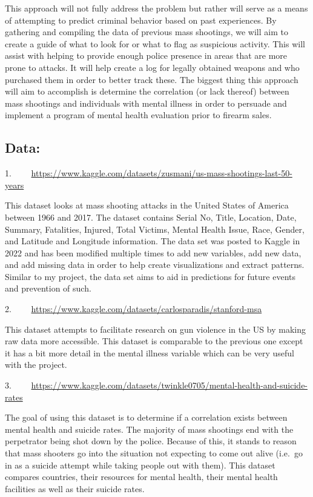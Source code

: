 \documentclass[
]{article}
\begin{document}
This approach will not fully address the problem but rather will serve
as a means of attempting to predict criminal behavior based on past
experiences. By gathering and compiling the data of previous mass
shootings, we will aim to create a guide of what to look for or what to
flag as suspicious activity. This will assist with helping to provide
enough police presence in areas that are more prone to attacks. It will
help create a log for legally obtained weapons and who purchased them in
order to better track these. The biggest thing this approach will aim to
accomplish is determine the correlation (or lack thereof) between mass
shootings and individuals with mental illness in order to persuade and
implement a program of mental health evaluation prior to firearm sales.

\subsection{Data:}\label{data}

1.~~~~
\url{https://www.kaggle.com/datasets/zusmani/us-mass-shootings-last-50-years}

This dataset looks at mass shooting attacks in the United States of
America between 1966 and 2017. The dataset contains Serial No, Title,
Location, Date, Summary, Fatalities, Injured, Total Victims, Mental
Health Issue, Race, Gender, and Latitude and Longitude information. The
data set was posted to Kaggle in 2022 and has been modified multiple
times to add new variables, add new data, and add missing data in order
to help create visualizations and extract patterns. Similar to my
project, the data set aims to aid in predictions for future events and
prevention of such.

2.~~~~ \url{https://www.kaggle.com/datasets/carlosparadis/stanford-msa}

This dataset attempts to facilitate research on gun violence in the US
by making raw data more accessible. This dataset is comparable to the
previous one except it has a bit more detail in the mental illness
variable which can be very useful with the project.

3.~~~~
\url{https://www.kaggle.com/datasets/twinkle0705/mental-health-and-suicide-rates}

The goal of using this dataset is to determine if a correlation exists
between mental health and suicide rates. The majority of mass shootings
end with the perpetrator being shot down by the police. Because of this,
it stands to reason that mass shooters go into the situation not
expecting to come out alive (i.e.~go in as a suicide attempt while
taking people out with them). This dataset compares countries, their
resources for mental health, their mental health facilities as well as
their suicide rates.
\end{document}
